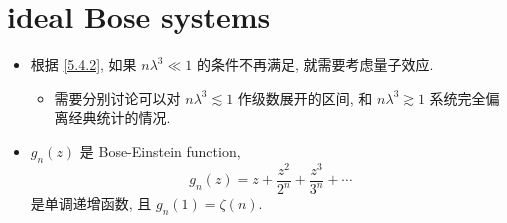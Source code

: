 \chapter{ideal Bose systems}
\begin{itemize}
	\item 根据 \eqref{5.4.2}, 如果 $n \lambda^3 \ll 1$ 的条件不再满足, 就需要考虑量子效应.
	\begin{itemize}
		\item 需要分别讨论可以对 $n \lambda^3 \lesssim 1$ 作级数展开的区间, 和 $n \lambda^3 \gtrsim 1$ 系统完全偏离经典统计的情况.
	\end{itemize}
	
	\item $g_n(z)$ 是 Bose-Einstein function,
	\begin{equation}
		g_n(z) = z + \frac{z^2}{2^n} + \frac{z^3}{3^n} + \cdots
	\end{equation}
	是单调递增函数, 且 $g_n(1) = \zeta(n)$.
\end{itemize}

